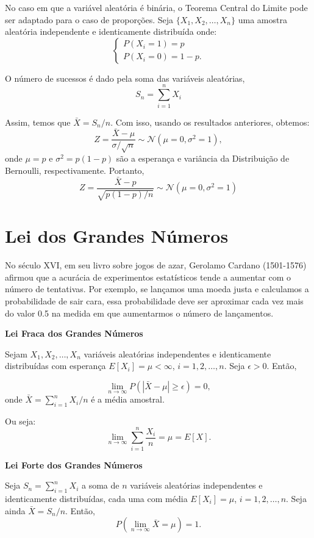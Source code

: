 \documentclass{article}
\begin{document}
No caso em que a variável aleatória é binária, o Teorema Central do Limite pode ser adaptado para o caso de proporções. Seja $\{X_1, X_2, \ldots, X_n\}$ uma amostra aleatória independente e identicamente distribuída onde:
    \[
    \begin{cases}
    P(X_i = 1) = p \\
    P(X_i = 0) = 1 - p.
    \end{cases}
    \]

O número de sucessos é dado pela soma das variáveis aleatórias,
    $$
    S_n = \sum_{i=1}^{n} X_i
    $$

Assim, temos que $\bar{X} = S_n/n$. Com isso, usando os resultados anteriores, obtemos:
    $$
    Z = \frac{\bar{X} - \mu}{\sigma / \sqrt{n}} \sim \mathcal{N}(\mu = 0, \sigma^2 = 1),
    $$
onde $\mu = p$ e $\sigma^2 = p(1 - p)$ são a esperança e variância da Distribuição de Bernoulli, respectivamente. Portanto,
    $$
    Z = \frac{\bar{X} - p}{\sqrt{p(1 - p)/n}} \sim \mathcal{N}(\mu = 0, \sigma^2 = 1)
    $$

\section{Lei dos Grandes Números}
No século XVI, em seu livro sobre jogos de azar, Gerolamo Cardano (1501-1576) afirmou que a acurácia de experimentos estatísticos tende a aumentar com o número de tentativas. Por exemplo, se lançamos uma moeda justa e calculamos a probabilidade de sair cara, essa probabilidade deve ser aproximar cada vez mais do valor 0.5 na medida em que aumentarmos o número de lançamentos.

\textbf{Lei Fraca dos Grandes Números}

Sejam $X_1, X_2, \ldots, X_n$ variáveis aleatórias independentes e identicamente distribuídas com esperança $E[X_i] = \mu < \infty$, $i = 1, 2, \ldots, n$. Seja $\epsilon > 0$. Então,

$$\lim_{n \to \infty} P(|\bar{X} - \mu| \geq \epsilon) = 0,$$
    onde $\bar{X} = \sum_{i=1}^n X_i / n$ é a média amostral.

Ou seja:
    $$\lim_{n \to \infty} \sum_{i=1}^n \frac{X_i}{n} = \mu = E[X].$$

\textbf{Lei Forte dos Grandes Números}

Seja $S_n = \sum_{i=1}^n X_i$ a soma de $n$ variáveis aleatórias independentes e identicamente distribuídas, cada uma com média $E[X_i] = \mu$, $i = 1, 2, \ldots, n$. Seja ainda $\bar{X} = S_n/n$. Então,
    $$P\left(\lim_{n \to \infty} \bar{X} = \mu\right) = 1.$$
\end{document}
